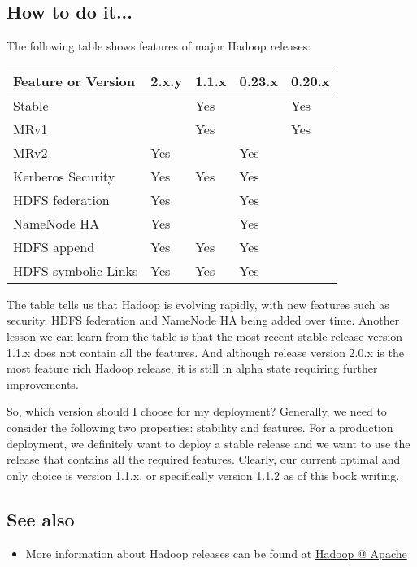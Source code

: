 \subsection*{How to do it...}
The following table shows features of major Hadoop releases:
\begin{table}[h]
  \centering
  \begin{tabular}{l|l|l|l|l}
    \toprule
    \textbf{Feature or Version} & \textbf{2.x.y} & \textbf{1.1.x} & \textbf{0.23.x} & \textbf{0.20.x} \\ \midrule
    Stable &  & Yes &  & Yes \\
    MRv1 &  & Yes &  & Yes \\
    MRv2 & Yes &  & Yes & \\
    Kerberos Security & Yes & Yes & Yes & \\
    HDFS federation & Yes &  & Yes & \\
    NameNode HA & Yes &  & Yes &  \\
    HDFS append & Yes & Yes & Yes & \\
    HDFS symbolic Links & Yes & Yes & Yes & \\ \bottomrule
  \end{tabular}
\end{table}
The table tells us that Hadoop is evolving rapidly, with new features such as security, HDFS federation and NameNode HA being added over time. Another lesson we can learn from the table is that the most recent stable release version 1.1.x does not contain all the features. And although release version 2.0.x is the most feature rich Hadoop release, it is still in alpha state requiring further improvements.

So, which version should I choose for my deployment? Generally, we need to consider the following two properties: stability and features. For a production deployment, we definitely want to deploy a stable release and we want to use the release that contains all the required features. Clearly, our current optimal and only choice is version 1.1.x, or specifically version 1.1.2 as of this book writing.

\subsection*{See also}
\begin{itemize}
  \item More information about Hadoop releases can be found at \href{http://hadoop.apache.org/releases.html}{Hadoop @ Apache}
\end{itemize}

